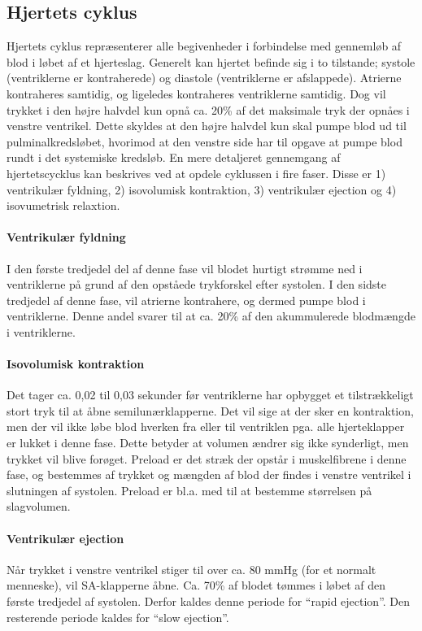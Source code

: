 \subsection{Hjertets cyklus}
Hjertets cyklus repræsenterer alle begivenheder i forbindelse med gennemløb af blod i løbet af et hjerteslag. Generelt kan hjertet befinde sig i to tilstande; systole (ventriklerne er kontraherede) og diastole (ventriklerne er afslappede). Atrierne kontraheres samtidig, og ligeledes kontraheres ventriklerne samtidig. Dog vil trykket i den højre halvdel kun opnå ca. 20\% af det maksimale tryk der opnåes i venstre ventrikel. Dette skyldes at den højre halvdel kun skal pumpe blod ud til pulminalkredsløbet, hvorimod at den venstre side har til opgave at pumpe blod rundt i det systemiske kredsløb. En mere detaljeret gennemgang af hjertetscycklus kan beskrives ved at opdele cyklussen i fire faser. Disse er 1) ventrikulær fyldning, 2) isovolumisk kontraktion, 3) ventrikulær ejection og 4) isovumetrisk relaxtion.

\paragraph*{Ventrikulær fyldning}
I den første tredjedel del af denne fase vil blodet hurtigt strømme ned i ventriklerne på grund af den opståede trykforskel efter systolen. I den sidste tredjedel af denne fase, vil atrierne kontrahere, og dermed pumpe blod i ventriklerne. Denne andel svarer til at ca. 20\% af den akummulerede blodmængde i ventriklerne. 

\paragraph*{Isovolumisk kontraktion}
Det tager ca. 0,02 til 0,03 sekunder før ventriklerne har opbygget et tilstrækkeligt stort tryk til at åbne semilunærklapperne. Det vil sige at der sker en kontraktion, men der vil ikke løbe blod hverken fra eller til ventriklen pga. alle hjerteklapper er lukket i denne fase. Dette betyder at volumen ændrer sig ikke synderligt, men trykket vil blive forøget. Preload er det stræk der opstår i muskelfibrene i denne fase, og bestemmes af trykket og mængden af blod der findes i venstre ventrikel i slutningen af systolen. Preload er bl.a. med til at bestemme størrelsen på slagvolumen.

\paragraph*{Ventrikulær ejection}
Når trykket i venstre ventrikel stiger til over ca. 80 mmHg (for et normalt menneske), vil SA-klapperne åbne. Ca. 70\% af blodet tømmes i løbet af den første tredjedel af systolen. Derfor kaldes denne periode for “rapid ejection”. Den resterende periode kaldes for “slow ejection”.

